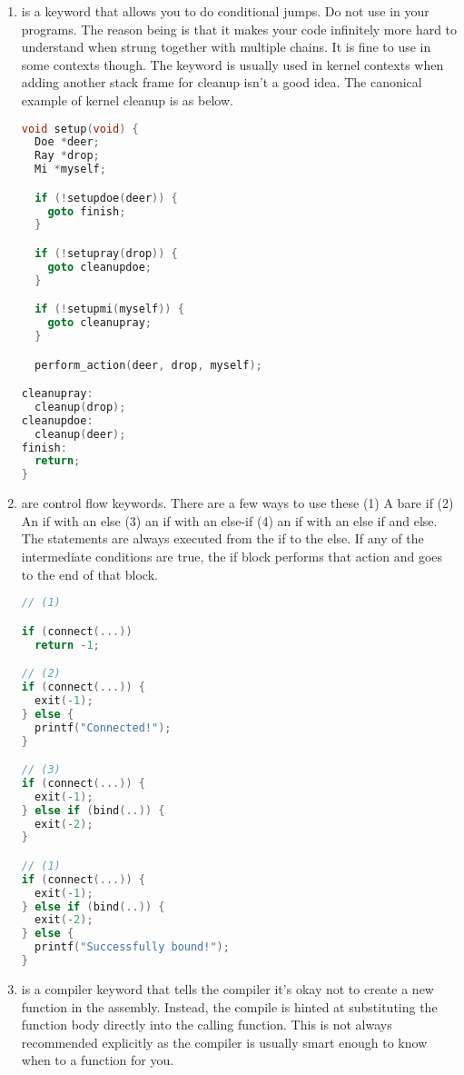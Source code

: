 \begin{enumerate}
\item {} is a keyword that allows you to do conditional jumps. Do not use  in your programs. The reason being is that it makes your code infinitely more hard to understand when strung together with multiple chains. It is fine to use in some contexts though. The keyword is usually used in kernel contexts when adding another stack frame for cleanup isn't a good idea. The canonical example of kernel cleanup is as below.

\begin{lstlisting}[language=C]
void setup(void) {
  Doe *deer;
  Ray *drop;
  Mi *myself;

  if (!setupdoe(deer)) {
    goto finish;
  } 

  if (!setupray(drop)) {
    goto cleanupdoe;
  } 

  if (!setupmi(myself)) {
    goto cleanupray;
  }

  perform_action(deer, drop, myself);

cleanupray:
  cleanup(drop);
cleanupdoe:
  cleanup(deer);
finish:
  return;
} 
\end{lstlisting}
\item {} are control flow keywords. There are a few ways to use these (1) A bare if (2) An if with an else (3) an if with an else-if (4) an if with an else if and else. The statements are always executed from the if to the else. If any of the intermediate conditions are true, the if block performs that action and goes to the end of that block.

\begin{lstlisting}[language=C]
// (1)

if (connect(...))
  return -1;

// (2)
if (connect(...)) {
  exit(-1);
} else {
  printf("Connected!");
}

// (3)
if (connect(...)) {
  exit(-1);
} else if (bind(..)) {
  exit(-2);
}

// (1)
if (connect(...)) {
  exit(-1);
} else if (bind(..)) {
  exit(-2);
} else {
  printf("Successfully bound!");
}
\end{lstlisting}

\item {} is a compiler keyword that tells the compiler it's okay not to create a new function in the assembly. Instead, the compile is hinted at substituting the function body directly into the calling function. This is not always recommended explicitly as the compiler is usually smart enough to know when to  a function for you.


\end{enumerate}
